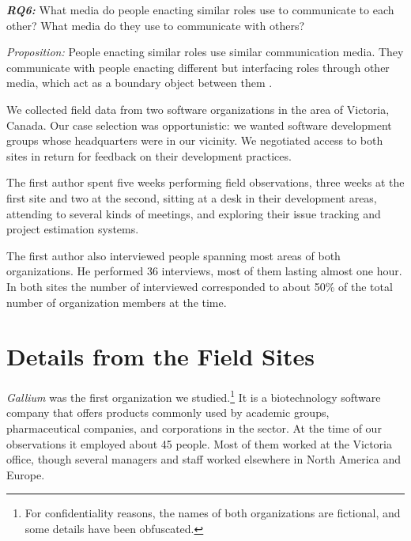 \documentclass[10pt, conference, compsocconf]{IEEEtran}
\begin{document}
\textbf{\emph{RQ6:}} What media do people enacting similar roles use to communicate to each other? What media do they use to communicate with others?

\emph{Proposition:} People enacting similar roles use similar communication media. They communicate with people enacting different but interfacing roles through other media, which act as a boundary object between them \cite{Bowker1999}.

We collected field data from two software organizations in the area of Victoria, Canada. Our case selection was opportunistic: we wanted software development groups whose headquarters were in our vicinity. We negotiated access to both sites in return for feedback on their development practices.

The first author spent five weeks performing field observations, three weeks at the first site and two at the second, sitting at a desk in their development areas, attending to several kinds of meetings, and exploring their issue tracking and project estimation systems.

The first author also interviewed people spanning most areas of both organizations. He performed 36 interviews, most of them lasting almost one hour. In both sites the number of interviewed corresponded to about 50\% of the total number of organization members at the time.




\section{Details from the Field Sites}

\emph{Gallium} was the first organization we studied.\footnote{For confidentiality reasons, the names of both organizations are fictional, and some details have been obfuscated.} It is a biotechnology software company that offers products commonly used by academic groups, pharmaceutical companies, and corporations in the sector. At the time of our observations it employed about 45 people. Most of them worked at the Victoria office, though several managers and staff worked elsewhere in North America and Europe.
\end{document}
